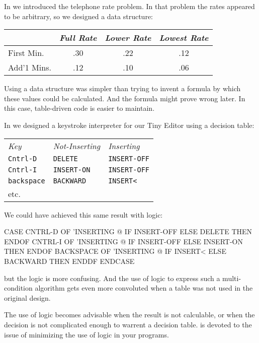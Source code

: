In  we introduced the telephone rate problem. In that
problem the rates appeared to be arbitrary, so we designed a data
structure:

\bigskip
\begin{tabular}{lccc}
          & \emph{Full Rate} & \emph{Lower Rate} & \emph{Lowest Rate} \\ \hline
First Min.  &       .30        &        .22        &          .12 \\ \hline
Add'1 Mins. &       .12        &        .10        &          .06 \\ \hline
\end{tabular}
\bigskip

Using a data structure was simpler than trying to invent a formula by
which these values could be calculated. And the formula might prove
wrong later. In this case, table-driven code is easier to maintain.

In  we designed a keystroke interpreter for our Tiny
Editor using a decision table:

\medskip
\begin{tabular}{lll}
\emph{Key}         & \emph{Not-Inserting} & \emph{Inserting} \\
\texttt{Cntrl-D}   & \texttt{DELETE}      & \texttt{INSERT-OFF} \\
\texttt{Cntrl-I}   & \texttt{INSERT-ON}   & \texttt{INSERT-OFF} \\
\texttt{backspace} & \texttt{BACKWARD}    & \texttt{INSERT<} \\
etc. & &
\end{tabular}
\medskip

We could have achieved this same result with logic:

\begin{Code}
CASE
   CNTRL-D    OF  'INSERTING @  IF
      INSERT-OFF   ELSE DELETE     THEN   ENDOF
   CNTRL-I    OF  'INSERTING @  IF
      INSERT-OFF   ELSE INSERT-ON  THEN   ENDOF
   BACKSPACE  OF  'INSERTING @  IF
      INSERT<      ELSE BACKWARD   THEN   ENDDF
ENDCASE
\end{Code}
but the logic is more confusing. And the use of logic to express such a
multi-condition algorithm gets even more convoluted when a table was
not used in the original design.

The use of logic becomes advisable when the result is not calculable,
or when the decision is not complicated enough to warrent a decision
table.  is devoted to the issue of minimizing the use of logic
in your programs.

